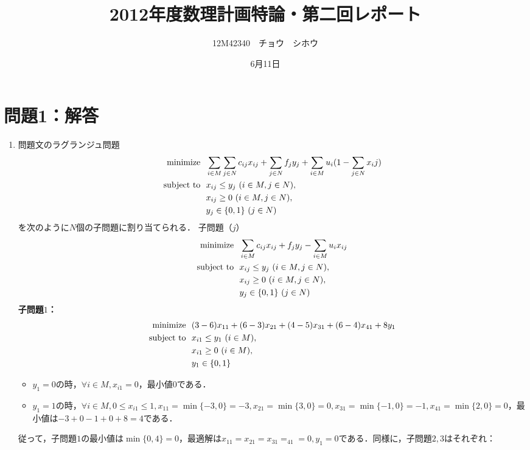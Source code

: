 \documentclass[a4paper,11pt]{jsarticle}
\title{2012年度数理計画特論・第二回レポート}
\author{12M42340　チョウ　シホウ}
\date{6月11日}
\numberwithin{theorem}{section}  %
\numberwithin{equation}{section} %
\newcommand{\minimize}{\mathop{\mathrm{\rm minimize}}\limits}
\begin{document}
{}
\renewcommand{\thepart}{\arabic{part}}


\section{問題1：解答}

\begin{enumerate}
\item 問題文のラグランジュ問題
\[
\begin{split}
\minimize &\,\,\,\,  \sum_{i \in M} \sum_{j \in N} c_{ij}x_{ij} + \sum_{j \in N} f_j y_j + \sum_{i \in M} u_i(1-\sum_{j\in N}x_ij)\\
\text{subject to} &\,\,\,\,  x_{ij} \le y_j \,\, (i \in M, j \in N),\\
&\,\,\,\,  x_{ij} \ge 0  \,\, (i \in M, j \in N),\\
&\,\,\,\,  y_j \in \{0,1\} \,\, (j \in N)
\end{split}
\]
を次のように$N$個の子問題に割り当てられる．
子問題（$j$）
\[
\begin{split}
\minimize &\,\,\,\, \sum_{i \in M} c_{ij}x_{ij} + f_jy_j - \sum_{i \in M} u_i x_{ij} \\
\text{subject to} &\,\,\,\,  x_{ij} \le y_j \,\, (i \in M, j \in N),\\
&\,\,\,\,  x_{ij} \ge 0  \,\, (i \in M, j \in N),\\
&\,\,\,\,  y_j \in \{0,1\} \,\, (j \in N)
\end{split}
\]
{\bf 子問題$1$：}
\[
\begin{split}
\minimize &\,\,\,\, (3-6)x_{11} + (6-3)x_{21} + (4-5)x_{31} + (6-4)x_{41} +8y_1\\
\text{subject to} &\,\,\,\,  x_{i1} \le y_1 \,\, (i \in M),\\
&\,\,\,\,  x_{i1} \ge 0  \,\, (i \in M),\\
&\,\,\,\,  y_1 \in \{0,1\}
\end{split}
\]
\begin{itemize}
\item $y_1 = 0$の時，$\forall i \in M, x_{i1}=0$，最小値$0$である．
\item $y_1 = 1$の時，$\forall i \in M, 0 \le x_{i1} \le 1,x_{11} = \min \{-3,0\} = -3, x_{21} = \min \{3,0\} = 0, x_{31} = \min \{-1,0\} = -1, x_{41} = \min \{2,0\} = 0$，最小値は$-3+0-1+0+8=4$である．
\end{itemize}
従って，子問題$1$の最小値は$\min \{ 0,4 \} = 0$，最適解は$x_{11}=x_{21}=x_{31}=_{41}=0,y_1=0$である．同様に，子問題$2,3$はそれぞれ：\\\\

\end{enumerate}
\end{document}
